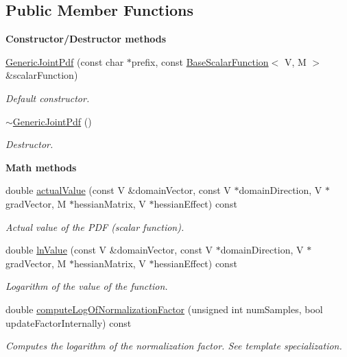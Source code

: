 \subsection*{Public Member Functions}
\begin{Indent}{\bf Constructor/\-Destructor methods}\par
\begin{DoxyCompactItemize}
\item 
\hyperlink{class_q_u_e_s_o_1_1_generic_joint_pdf_a580b11a250bfcf29176ca3c94547ed20}{Generic\-Joint\-Pdf} (const char $\ast$prefix, const \hyperlink{class_q_u_e_s_o_1_1_base_scalar_function}{Base\-Scalar\-Function}$<$ V, M $>$ \&scalar\-Function)
\begin{DoxyCompactList}\small\item\em Default constructor. \end{DoxyCompactList}\item 
\hyperlink{class_q_u_e_s_o_1_1_generic_joint_pdf_a5668d8d87960dc04dbde2821339b09f8}{$\sim$\-Generic\-Joint\-Pdf} ()
\begin{DoxyCompactList}\small\item\em Destructor. \end{DoxyCompactList}\end{DoxyCompactItemize}
\end{Indent}
\begin{Indent}{\bf Math methods}\par
\begin{DoxyCompactItemize}
\item 
double \hyperlink{class_q_u_e_s_o_1_1_generic_joint_pdf_a7bddaaf1d4087ca8e35fcb83c0df72d2}{actual\-Value} (const V \&domain\-Vector, const V $\ast$domain\-Direction, V $\ast$grad\-Vector, M $\ast$hessian\-Matrix, V $\ast$hessian\-Effect) const 
\begin{DoxyCompactList}\small\item\em Actual value of the P\-D\-F (scalar function). \end{DoxyCompactList}\item 
double \hyperlink{class_q_u_e_s_o_1_1_generic_joint_pdf_a566150d033ce9c09a22c6f271a7155a8}{ln\-Value} (const V \&domain\-Vector, const V $\ast$domain\-Direction, V $\ast$grad\-Vector, M $\ast$hessian\-Matrix, V $\ast$hessian\-Effect) const 
\begin{DoxyCompactList}\small\item\em Logarithm of the value of the function. \end{DoxyCompactList}\item 
double \hyperlink{class_q_u_e_s_o_1_1_generic_joint_pdf_a282b1db04e25086938f3b8969ba484a9}{compute\-Log\-Of\-Normalization\-Factor} (unsigned int num\-Samples, bool update\-Factor\-Internally) const 
\begin{DoxyCompactList}\small\item\em Computes the logarithm of the normalization factor. See template specialization. \end{DoxyCompactList}\end{DoxyCompactItemize}
\end{Indent}
